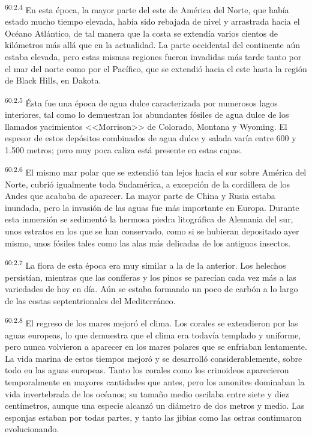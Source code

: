 \par
\textsuperscript{60:2.4} En esta época, la mayor parte del este de América del Norte, que había estado mucho tiempo elevada, había sido rebajada de nivel y arrastrada hacia el Océano Atlántico, de tal manera que la costa se extendía varios cientos de kilómetros más allá que en la actualidad. La parte occidental del continente aún estaba elevada, pero estas mismas regiones fueron invadidas más tarde tanto por el mar del norte como por el Pacífico, que se extendió hacia el este hasta la región de Black Hills, en Dakota.

\par
\textsuperscript{60:2.5} Ésta fue una época de agua dulce caracterizada por numerosos lagos interiores, tal como lo demuestran los abundantes fósiles de agua dulce de los llamados yacimientos <<Morrison>> de Colorado, Montana y Wyoming. El espesor de estos depósitos combinados de agua dulce y salada varía entre 600 y 1.500 metros; pero muy poca caliza está presente en estas capas.

\par
\textsuperscript{60:2.6} El mismo mar polar que se extendió tan lejos hacia el sur sobre América del Norte, cubrió igualmente toda Sudamérica, a excepción de la cordillera de los Andes que acababa de aparecer. La mayor parte de China y Rusia estaba inundada, pero la invasión de las aguas fue más importante en Europa. Durante esta inmersión se sedimentó la hermosa piedra litográfica de Alemania del sur, unos estratos en los que se han conservado, como si se hubieran depositado ayer mismo, unos fósiles tales como las alas más delicadas de los antiguos insectos.

\par
\textsuperscript{60:2.7} La flora de esta época era muy similar a la de la anterior. Los helechos persistían, mientras que las coníferas y los pinos se parecían cada vez más a las variedades de hoy en día. Aún se estaba formando un poco de carbón a lo largo de las costas septentrionales del Mediterráneo.

\par
\textsuperscript{60:2.8} El regreso de los mares mejoró el clima. Los corales se extendieron por las aguas europeas, lo que demuestra que el clima era todavía templado y uniforme, pero nunca volvieron a aparecer en los mares polares que se enfriaban lentamente. La vida marina de estos tiempos mejoró y se desarrolló considerablemente, sobre todo en las aguas europeas. Tanto los corales como los crinoideos aparecieron temporalmente en mayores cantidades que antes, pero los amonites dominaban la vida invertebrada de los océanos; su tamaño medio oscilaba entre siete y diez centímetros, aunque una especie alcanzó un diámetro de dos metros y medio. Las esponjas estaban por todas partes, y tanto las jibias como las ostras continuaron evolucionando.

